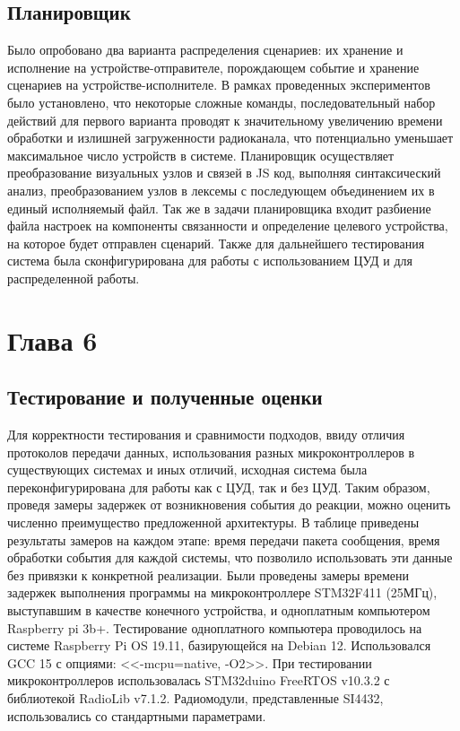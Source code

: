 \documentclass[14pt, a4paper]{extreport}
\begin{document}
\section{Планировщик}
Было опробовано два варианта распределения сценариев: их хранение и исполнение на устройстве-отправителе, порождающем событие и хранение сценариев на устройстве-исполнителе. В рамках проведенных экспериментов было установлено, что некоторые сложные команды, последовательный набор действий для первого варианта проводят к значительному увеличению времени обработки и излишней загруженности радиоканала, что потенциально уменьшает максимальное число устройств в системе.
Планировщик осуществляет преобразование визуальных узлов и связей в JS код, выполняя синтаксический анализ, преобразованием узлов в лексемы с последующем объединением их в единый исполняемый файл. Так же в задачи планировщика входит разбиение файла настроек на компоненты связанности и определение целевого устройства, на которое будет отправлен сценарий.
Также для дальнейшего тестирования система была сконфигурирована для работы с использованием ЦУД и для распределенной работы.


\newpage

\chapter{Глава 6}

\section{Тестирование и полученные оценки}

Для корректности тестирования и сравнимости подходов, ввиду отличия протоколов передачи данных, использования разных
микроконтроллеров в существующих системах и иных отличий, исходная система была переконфигурирована для работы как с
ЦУД, так и без ЦУД. Таким образом, проведя замеры задержек от возникновения события до реакции, можно оценить численно
преимущество предложенной архитектуры. В таблице приведены результаты замеров на каждом этапе: время передачи
пакета сообщения, время обработки события для каждой системы, что позволило использовать эти данные без привязки к
конкретной реализации. Были проведены замеры времени задержек выполнения программы на микроконтроллере STM32F411
(25МГц), выступавшим в качестве конечного устройства, и одноплатным компьютером Raspberry pi 3b+. Тестирование
одноплатного компьютера проводилось на системе Raspberry Pi OS 19.11, базирующейся на Debian 12. Использовался GCC 15
с опциями: <<-mcpu=native, -O2>>. При тестировании микроконтроллеров использовалась STM32duino FreeRTOS v10.3.2 с
библиотекой RadioLib v7.1.2. Радиомодули, представленные SI4432, использовались со стандартными параметрами.
\end{document}
